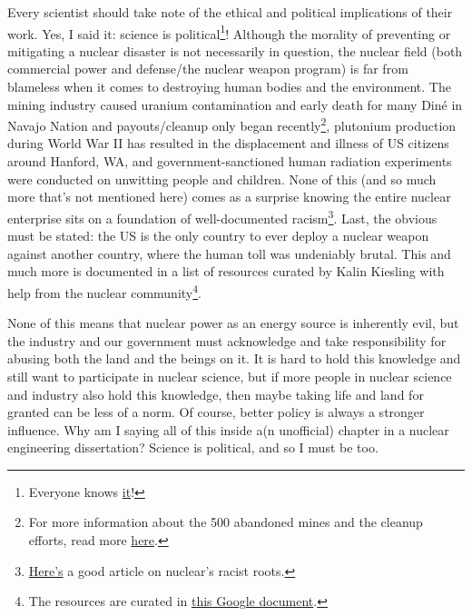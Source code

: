 {Every scientist should take note of the ethical and political implications of
their work. Yes, I said it: science is political\footnote[8]{Everyone knows
\href{https://www.scientificamerican.com/article/yes-science-is-political/}{\color{violet}it}!}!
Although the morality of preventing or mitigating a nuclear disaster is not
necessarily in question, the nuclear field (both commercial power and
defense/the nuclear weapon program) is far from blameless when it comes to
destroying human bodies and the environment. The mining industry caused uranium
contamination and early death for many Din\'{e} in Navajo Nation and
payouts/cleanup only began recently\footnote[9]{For more information about the
500 abandoned mines and the cleanup efforts, read more
\href{https://www.epa.gov/navajo-nation-uranium-cleanup/abandoned-mines-cleanup}{\color{violet}here}.},
plutonium production during World War II has resulted in the displacement and
illness of US citizens around Hanford, WA, and government-sanctioned human
radiation experiments were conducted on unwitting people and children. None of
this (and so much more that's not mentioned here) comes as a surprise knowing
the entire nuclear enterprise sits on a foundation of well-documented
racism\footnote[10]{\href{https://thebulletin.org/2020/08/a-call-for-antiracist-action-and-accountability-in-the-us-nuclear-community/}{\color{violet}Here's}
a good article on nuclear's racist roots.}.  Last, the obvious must be stated:
the US is the only country to ever deploy a nuclear weapon against another
country, where the human toll was undeniably brutal. This and much more is
documented in a list of resources curated by Kalin Kiesling with help from the
nuclear community\footnote[11]{The resources are curated in
\href{https://docs.google.com/document/d/e/2PACX-1vQuRSix5J31G4yhH-Z0kwmlpXe6OgS9MXg6l-LBEOVNDPDAPVivPSrJ7A71TMCsW2EdvGMepZCcwdTP/pub}{\color{violet}this
Google document}.}.

None of this means that nuclear power as an energy source is inherently evil,
but the industry and our government must acknowledge and take responsibility
for abusing both the land and the beings on it. It is hard to hold this
knowledge and still want to participate in nuclear science, but if more people
in nuclear science and industry also hold this knowledge, then maybe taking
life and land for granted can be less of a norm. Of course, better policy is
always a stronger influence. Why am I saying all of this inside a(n unofficial)
chapter in a nuclear engineering dissertation? Science is political, and so I
must be too.  

}
